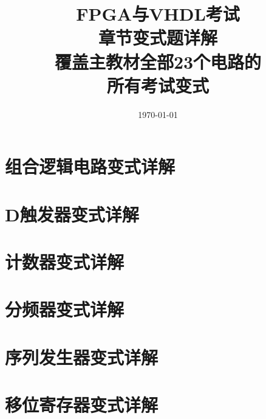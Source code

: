 \documentclass[12pt,a4paper,openany]{ctexbook}
\title{\Huge\textbf{FPGA与VHDL考试\\章节变式题详解}\\[0.5cm]
       \Large 覆盖主教材全部23个电路的\\所有考试变式}
\author{}
\date{\today}
\begin{document}
\maketitle
\tableofcontents

\part{组合逻辑电路变式详解}








\part{D触发器变式详解}


\part{计数器变式详解}


\part{分频器变式详解}


\part{序列发生器变式详解}


\part{移位寄存器变式详解}


\end{document}
